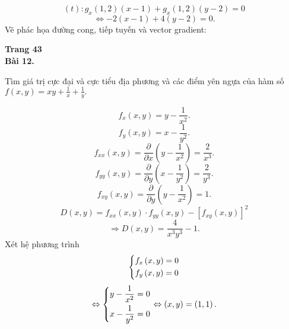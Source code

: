 \documentclass[12pt,a4paper]{article}
\begin{document}
\[\left( t \right):{g_x}\left( {1,2} \right)\left( {x - 1} \right) + {g_x}\left( {1,2} \right)\left( {y - 2} \right) = 0\]
\[ \Leftrightarrow  - 2\left( {x - 1} \right) + 4\left( {y - 2} \right) = 0.\]
Vẽ phác họa đường cong, tiếp tuyến và vector gradient:
\begin{center}
\end{center}
\textbf{Trang 43}\\
\textbf{Bài 12.}
\begin{mybox}
Tìm giá trị cực đại và cực tiểu địa phương và các điểm yên ngựa của hàm số \(f \left( {x, y} \right) = xy + \frac{1}{x} + \frac{1}{y}.\)
\end{mybox}
\[{f_x}\left( {x,y} \right) = y - \frac{1}{{{x^2}}}.\]
\[{f_y}\left( {x,y} \right) = x - \frac{1}{{{y^2}}}.\]
\[{f_{xx}}\left( {x,y} \right) = \frac{\partial }{{\partial x}}\left( {y - \frac{1}{{{x^2}}}} \right) = \frac{2}{{{x^3}}}.\]
\[{f_{yy}}\left( {x,y} \right) = \frac{\partial }{{\partial y}}\left( {x - \frac{1}{{{y^2}}}} \right) = \frac{2}{{{y^3}}}.\]
\[{f_{xy}}\left( {x,y} \right) = \frac{\partial }{{\partial y}}\left( {y - \frac{1}{{{x^2}}}} \right) = 1.\]
\[D\left( {x,y} \right) = {f_{xx}}\left( {x,y} \right) \cdot {f_{yy}}\left( {x,y} \right) - {\left[ {{f_{xy}}\left( {x,y} \right)} \right]^2}\]
\[ \Rightarrow D\left( {x,y} \right) = \frac{4}{{{x^3}{y^3}}} - 1.\]
Xét hệ phương trình
\[\left\{ \begin{gathered}
  {f_x}\left( {x,y} \right) = 0 \hfill \\
  {f_y}\left( {x,y} \right) = 0 \hfill \\ 
\end{gathered}  \right.\]
\[ \Leftrightarrow \left\{ \begin{gathered}
  y - \frac{1}{{{x^2}}} = 0 \hfill \\
  x - \frac{1}{{{y^2}}} = 0 \hfill \\ 
\end{gathered}  \right. \Leftrightarrow \left( {x,y} \right) = \left( {1,1} \right).\]
\end{document}
